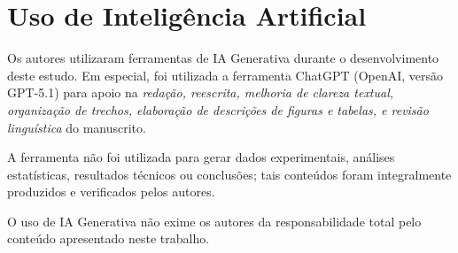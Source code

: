 \documentclass[12pt]{article}
\begin{document}
\section*{Uso de Inteligência Artificial}
Os autores utilizaram ferramentas de IA Generativa durante o desenvolvimento deste estudo. Em especial, foi utilizada a ferramenta ChatGPT (OpenAI, versão GPT-5.1) para apoio na \textit{redação, reescrita, melhoria de clareza textual, organização de trechos, elaboração de descrições de figuras e tabelas, e revisão linguística} do manuscrito.

A ferramenta não foi utilizada para gerar dados experimentais, análises estatísticas, resultados técnicos ou conclusões; tais conteúdos foram integralmente produzidos e verificados pelos autores.

O uso de IA Generativa não exime os autores da responsabilidade total pelo conteúdo apresentado neste trabalho.



\end{document}
